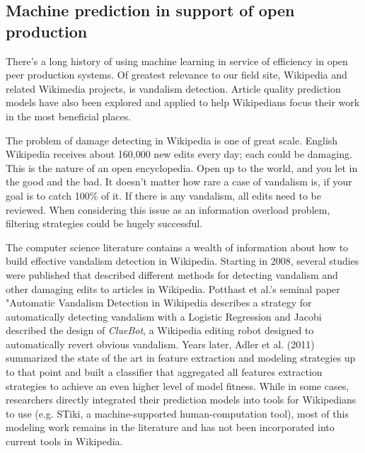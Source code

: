 \subsection{Machine prediction in support of open production}
There's a long history of using machine learning in service of efficiency in open peer production systems.  Of greatest relevance to our field site, Wikipedia and related Wikimedia projects, is vandalism detection.  Article quality prediction models have also been explored and applied to help Wikipedians focus their work in the most beneficial places.

 The problem of damage detecting in Wikipedia is one of great scale.  English Wikipedia receives about 160,000 new edits every day; each could be damaging.  This is the nature of an open encyclopedia. Open up to the world, and you let in the good and the bad.  It doesn't matter how rare a case of vandalism is, if your goal is to catch 100\% of it.  If there is any vandalism, all edits need to be reviewed.  When considering this issue as an information overload problem, filtering strategies could be hugely successful.

The computer science literature contains a wealth of information about how to build effective vandalism detection in Wikipedia.  Starting in 2008, several studies were published that described different methods for detecting vandalism and other damaging edits to articles in Wikipedia.  Potthast et al.'s seminal paper "Automatic Vandalism Detection in Wikipedia\cite{potthast2008automatic} describes a strategy for automatically detecting vandalism with a Logistic Regression and Jacobi described the design of \emph{ClueBot}\cite{carter2008cluebot}, a Wikipedia editing robot designed to automatically revert obvious vandalism.  Years later, Adler et al. (2011) summarized the state of the art in feature extraction and modeling strategies up to that point and built a classifier that aggregated all features extraction strategies to achieve an even higher level of model fitness\cite{adler2011wikipedia}.  While in some cases, researchers directly integrated their prediction models into tools for Wikipedians to use (e.g. STiki\cite{west2010stiki}, a machine-supported human-computation tool), most of this modeling work remains in the literature and has not been incorporated into current tools in Wikipedia.

